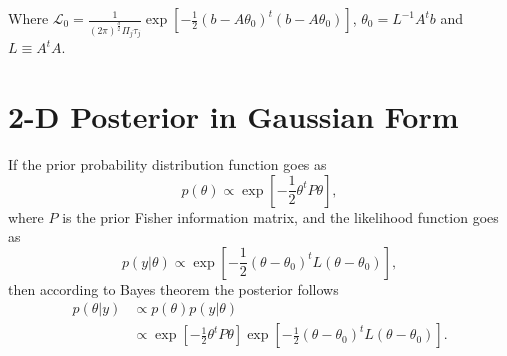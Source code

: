 \documentclass[a4paper,11pt,twoside]{article}
\begin{document}
Where $\mathcal{L}_0 = \frac{1}{(2\pi)^{\frac{d}{2}}\Pi_j\tau_j} \exp\left[-\frac{1}{2}(b - A \theta_0)^t (b - A \theta_0)\right]$, $\theta_0 = L^{-1} A^t b$ and $L \equiv A^tA$.

\section{2-D Posterior in Gaussian Form}
If the prior probability distribution function goes as
\begin{equation*}
	p(\theta) \propto \exp \left[ -\frac{1}{2} \theta^t P \theta \right],
\end{equation*}
where $P$ is the prior Fisher information matrix, and the likelihood function goes as
\begin{equation*}
	p(y|\theta) \propto \exp\left[-\frac{1}{2} (\theta - \theta_0)^t L (\theta - \theta_0)\right],
\end{equation*}
then according to Bayes theorem the posterior follows
\begin{align*}
	p(\theta|y) & \propto p(\theta) p(y|\theta) 
	\\ & \propto \exp \left[ -\frac{1}{2} \theta^t P \theta \right] \exp\left[-\frac{1}{2} (\theta - \theta_0)^t L (\theta - \theta_0)\right].
\end{align*}
\end{document}
